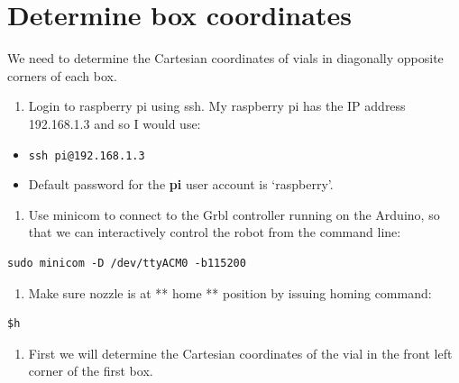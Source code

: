 \documentclass[
]{book}
\providecommand{\tightlist}{%
  \setlength{\itemsep}{0pt}\setlength{\parskip}{0pt}}
\begin{document}
\hypertarget{boxCoordinates}{%
\section{Determine box coordinates}\label{boxCoordinates}}

We need to determine the Cartesian coordinates of vials in diagonally opposite corners of each box.

\begin{enumerate}
\def\labelenumi{\arabic{enumi}.}
\tightlist
\item
  Login to raspberry pi using ssh. My raspberry pi has the IP address 192.168.1.3 and so I would use:
\end{enumerate}

\begin{itemize}
\tightlist
\item
  \texttt{ssh\ pi@192.168.1.3}
\item
  Default password for the \textbf{pi} user account is `raspberry'.
\end{itemize}

\begin{enumerate}
\def\labelenumi{\arabic{enumi}.}
\setcounter{enumi}{1}
\tightlist
\item
  Use minicom to connect to the Grbl controller running on the Arduino, so that we can interactively control the robot from the command line:
\end{enumerate}

\begin{verbatim}
sudo minicom -D /dev/ttyACM0 -b115200
\end{verbatim}

\begin{enumerate}
\def\labelenumi{\arabic{enumi}.}
\setcounter{enumi}{2}
\tightlist
\item
  Make sure nozzle is at ** home ** position by issuing homing command:
\end{enumerate}

\begin{verbatim}
$h
\end{verbatim}

\begin{enumerate}
\def\labelenumi{\arabic{enumi}.}
\setcounter{enumi}{3}
\tightlist
\item
  First we will determine the Cartesian coordinates of the vial in the front left corner of the first box.
\end{enumerate}
\end{document}
